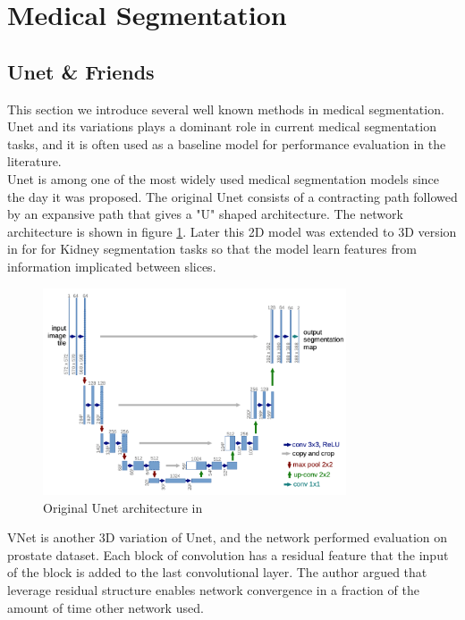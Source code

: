\section{Medical Segmentation}
\subsection{Unet \& Friends}
This section we introduce several well known methods in medical segmentation. Unet \cite{ronneberger_u-net_2015} and its variations plays a dominant role in current medical segmentation tasks, and it is often used as a baseline model for performance evaluation in the literature.\\

Unet \cite{ronneberger_u-net_2015} is among one of the most widely used medical segmentation models since the day it was proposed. The original Unet consists of a contracting path followed by an expansive path that gives a "U" shaped architecture. The network architecture is shown in figure \ref{fig:unet-arch}.
Later this 2D model was extended to 3D version in \cite{ourselin_3d_2016} for for Kidney segmentation tasks so that the model learn features from information implicated between slices.\\
\begin{figure}
\centering
\includegraphics[width = 0.8\textwidth]{img/Unet_architecture}
\caption{Original Unet architecture in \cite{ronneberger_u-net_2015}}
\label{fig:unet-arch}
\end{figure}

VNet \cite{milletari_v-net_2016} is another 3D variation of Unet, and the network performed evaluation on prostate dataset. Each block of convolution has a residual feature that the input of the block is added to the last convolutional layer. The author argued that leverage residual structure enables network convergence in a fraction of the amount of time other network used.
